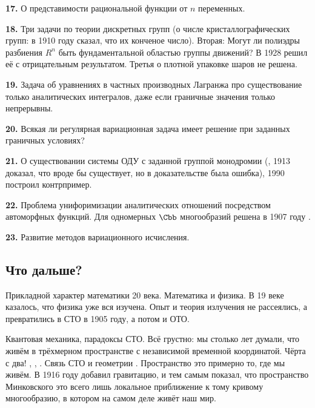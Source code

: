 \documentclass[a4paper,oneside,fleqn,10pt]{article}
\begin{document}
\textbf{17.} О представимости рациональной функции от $n$ переменных.

\medskip

\textbf{18.} Три  задачи по теории дискретных групп (о числе кристаллографических групп:
 в 1910 году сказал, что их конченое число).
Вторая: Могут ли полиэдры разбиения $R^n$ быть фундаментальной областью группы движений?
В 1928  решил её с отрицательным результатом.
Третья о плотной упаковке шаров не решена.

\medskip

\textbf{19.} Задача об уравнениях в частных производных Лагранжа
про существование только аналитических интегралов,
даже если граничные значения только непрерывны.

\medskip

\textbf{20.} Всякая ли регулярная вариационная задача имеет решение при заданных граничных условиях?

\medskip

\textbf{21.} О существовании системы ОДУ с заданной группой монодромии
(, 1913 доказал, что вроде бы существует, но в доказательстве была ошибка),
1990  построил контрпример.

\medskip

\textbf{22.} Проблема унифоримизации аналитических отношений посредством
автоморфных функций. Для одномерных $\Cbb$ многообразий решена в 1907 году .

\medskip

\textbf{23.} Развитие методов вариационного исчисления.

\subsection{Что дальше?}

Прикладной характер математики 20 века. Математика и физика.
В 19 веке казалось, что физика уже вся изучена.
Опыт  и теория излучения не рассеялись,
а превратились в СТО в 1905 году, а потом и ОТО.

Квантовая механика, парадоксы СТО. Всё грустно: мы столько лет думали, что живём в трёхмерном пространстве
с независимой временной координатой. Чёрта с два! , , .
Связь СТО и геометрии . Пространство  это примерно то, где мы живём.
В 1916 году  добавил гравитацию, и тем самым показал, что пространство Минковского это всего лишь локальное
приближение к тому кривому многообразию, в котором на самом деле живёт наш мир.
\end{document}
